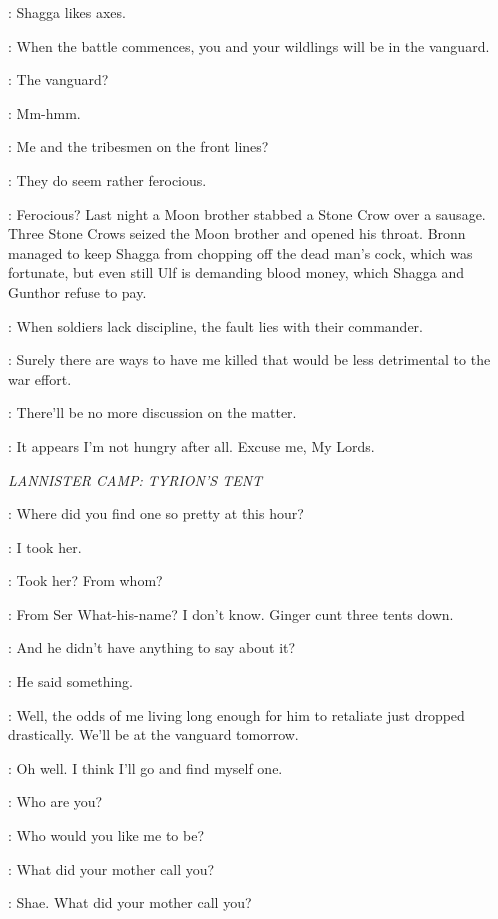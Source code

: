 \TYRION: Shagga likes axes. 

\TYWIN: When the battle commences, you and your wildlings will be in the vanguard. 

\TYRION: The vanguard? 

\TYWIN: Mm-hmm. 

\TYRION: Me and the tribesmen on the front lines? 

\KEVAN: They do seem rather ferocious. 

\TYRION: Ferocious? Last night a Moon brother stabbed a Stone Crow over a sausage. Three Stone Crows seized the Moon brother and opened his throat. Bronn managed to keep Shagga from chopping off the dead man's cock, which was fortunate, but even still Ulf is demanding blood money, which Shagga and Gunthor refuse to pay. 

\TYWIN: When soldiers lack discipline, the fault lies with their commander. 

\TYRION: Surely there are ways to have me killed that would be less detrimental to the war effort. 

\TYWIN: There'll be no more discussion on the matter. 

\TYRION: It appears I'm not hungry after all. Excuse me, My Lords. 

\scene

\textit{LANNISTER CAMP: TYRION'S TENT} 


\TYRION: Where did you find one so pretty at this hour? 

\BRONN: I took her. 

\TYRION: Took her? From whom? 

\BRONN: From Ser What-his-name? I don't know. Ginger cunt three tents down. 

\TYRION: And he didn't have anything to say about it? 

\BRONN: He said something. 

\TYRION: Well, the odds of me living long enough for him to retaliate just dropped drastically. We'll be at the vanguard tomorrow. 

\BRONN: Oh well. I think I'll go and find myself one. 

\TYRION: Who are you? 

\SHAE: Who would you like me to be? 

\TYRION: What did your mother call you? 

\SHAE: Shae. What did your mother call you? 

